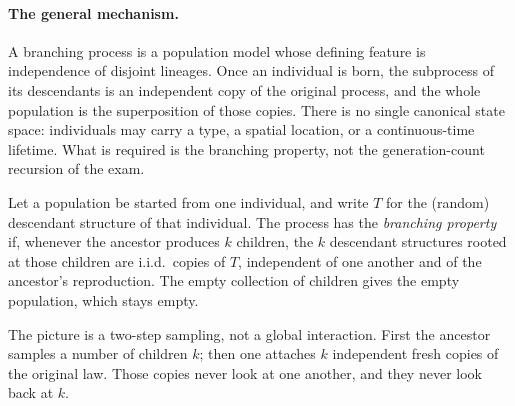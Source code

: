\documentclass[11pt,a4paper]{article}
\begin{document}
\paragraph{The general mechanism.}
A branching process is a population model whose defining feature is independence of disjoint lineages. Once an individual is born, the subprocess of its descendants is an independent copy of the original process, and the whole population is the superposition of those copies. There is no single canonical state space: individuals may carry a type, a spatial location, or a continuous-time lifetime. What is required is the branching property, not the generation-count recursion of the exam.

\begin{definition}
\label{def:branching-property}
Let a population be started from one individual, and write \(T\) for the (random) descendant structure of that individual. The process has the \emph{branching property} if, whenever the ancestor produces \(k\) children, the \(k\) descendant structures rooted at those children are i.i.d.\ copies of \(T\), independent of one another and of the ancestor's reproduction. The empty collection of children gives the empty population, which stays empty.
\end{definition}

The picture is a two-step sampling, not a global interaction. First the ancestor samples a number of children \(k\); then one attaches \(k\) independent fresh copies of the original law. Those copies never look at one another, and they never look back at \(k\).

\begin{center}
\end{center}
\end{document}
